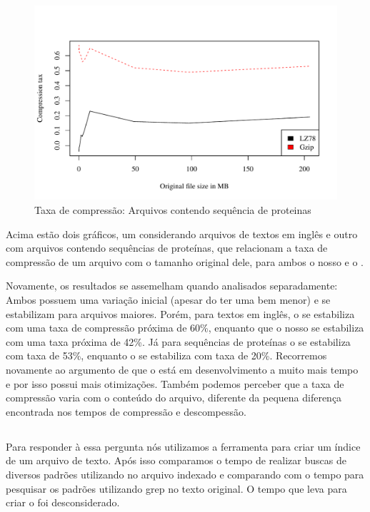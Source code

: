 \begin{figure}[H]
\includegraphics[scale=0.74]{../experiments/R/pdf/proteins_comp_tax}
\caption{Taxa de compressão: Arquivos contendo sequência de proteinas}
\end{figure}



Acima estão dois gráficos, um considerando arquivos de textos em inglês e outro
com arquivos contendo sequências de proteínas,
que relacionam a taxa de compressão de um arquivo com o
tamanho original dele, para ambos o nosso \lz e o \gzip.

Novamente, os resultados se assemelham quando analisados separadamente:
Ambos possuem uma variação inicial (apesar do \gzip ter uma bem menor) e se
estabilizam para arquivos maiores. Porém, para textos em inglês,
o \gzip se estabiliza com uma taxa de compressão próxima de 60\%,
enquanto que o nosso \lz se estabiliza com uma taxa
próxima de 42\%. Já para sequências de proteínas o \gzip se estabiliza com taxa
de 53\%, enquanto o \lz se estabiliza com taxa de 20\%.
Recorremos novamente ao argumento de que o \gzip está em
desenvolvimento a muito mais tempo e por isso possui mais otimizações.
Também podemos perceber que a taxa de compressão varia com o conteúdo do
arquivo, diferente da pequena diferença encontrada nos tempos de compressão e
descompessão.


\subsection{\rqtwo}
Para responder à essa pergunta nós utilizamos a ferramenta \ipmt para criar um
índice de um arquivo de texto. Após isso comparamos o tempo de realizar buscas
de diversos padrões utilizando \ipmt no arquivo indexado e comparando com o
tempo para pesquisar os padrões utilizando grep no texto original. O tempo
que leva para criar o \lsa foi desconsiderado.


